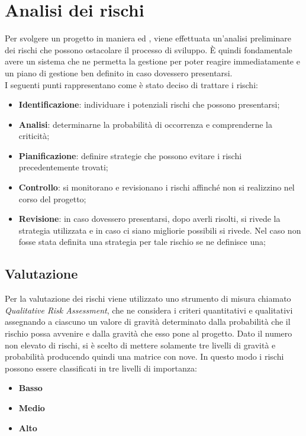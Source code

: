 
\newpage
\section{Analisi dei rischi} \label{AnalisiDeiRischi}
	Per svolgere un progetto in maniera  ed , viene effettuata un'analisi preliminare dei rischi che possono ostacolare il processo di sviluppo.
	È quindi fondamentale avere un sistema che ne permetta la gestione per poter reagire immediatamente e un piano di gestione ben definito in caso dovessero presentarsi.\\
	I seguenti punti rappresentano come è stato deciso di trattare i rischi:
	\begin{itemize}
		\item \textbf{Identificazione}: individuare i potenziali rischi che possono presentarsi;
		\item \textbf{Analisi}: determinarne la probabilità di occorrenza e comprenderne la criticità;
		\item \textbf{Pianificazione}: definire strategie che possono evitare i rischi precedentemente trovati;
		\item \textbf{Controllo}: si monitorano e revisionano i rischi affinché non si realizzino nel corso del progetto;
		\item \textbf{Revisione}: in caso dovessero presentarsi, dopo averli risolti, si rivede la strategia utilizzata e in caso ci siano migliorie possibili si rivede. Nel caso non fosse stata definita una strategia per tale rischio se ne definisce una;
	\end{itemize}
	\subsection{Valutazione}
	Per la valutazione dei rischi viene utilizzato uno strumento di misura chiamato \textit{Qualitative Risk Assessment}, che ne considera i criteri quantitativi e qualitativi assegnando a ciascuno un valore di gravità determinato dalla probabilità che il rischio possa avvenire e dalla gravità che esso pone al progetto.
	Dato il numero non elevato di rischi, si è scelto di mettere solamente tre livelli di gravità e probabilità producendo quindi una matrice con nove. In questo modo i rischi possono essere classificati in tre livelli di importanza:
	
	\begin{itemize}
		\item \textbf{Basso}
		\item \textbf{Medio}
		\item \textbf{Alto}
	\end{itemize}

